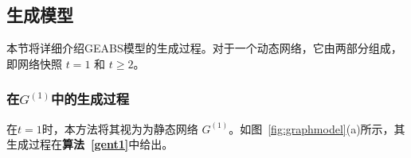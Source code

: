 \subsection{生成模型}

本节将详细介绍GEABS模型的生成过程。对于一个动态网络，它由两部分组成，即网络快照 $t=1$ 和 $t \ge 2$。

\subsubsection{在$G^{(1)}$中的生成过程}
在$t=1$时，本方法将其视为为静态网络 $G^{(1)}$。如图~\ref{fig:graphmodel}(a)所示，其生成过程在\textbf{算法~\ref{gent1}}中给出。



